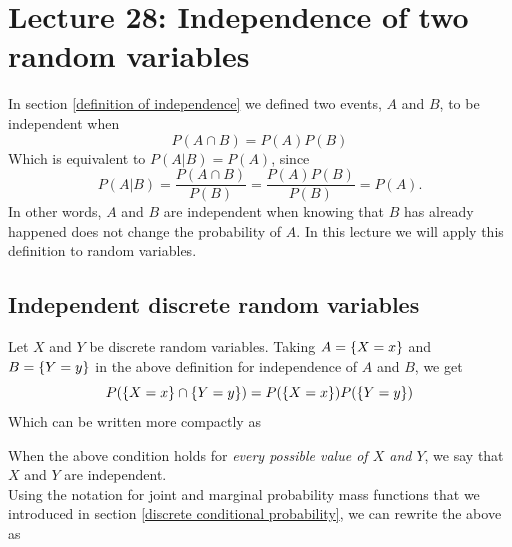 \chapter{Lecture 28: Independence of two random variables}
In section \ref{definition of independence} we defined two events, $A$ and $B$, to be independent when
\[
P(A \cap B) = P(A)P(B)
\]
Which is equivalent to $P(A|B) = P(A)$, since
\[
P(A|B) = \frac{P(A \cap B)}{P(B)} = \frac{P(A)P(B)}{P(B)} = P(A).
\]
In other words, $A$ and $B$ are independent when knowing that $B$ has already happened does not change the probability of $A$. In this lecture we will apply this definition to random variables.

\section{Independent discrete random variables}
Let $X$ and $Y$ be discrete random variables. Taking $A = \left\{X = x\right\}$ and $B = \left\{Y = y\right\}$ in the above definition for independence of $A$ and $B$, we get
\[
P(\left\{X=x\right\} \cap \left\{Y = y\right\}) = P(\left\{X = x\right\})P(\left\{Y = y\right\})
\]
Which can be written more compactly as

  	\bigskip
	
	\hfil{}
	\bigskip
	\bigskip

\noindent When the above condition holds for \textit{every possible value of $X$ and $Y$}, we say that $X$ and $Y$ are independent. \\

\noindent Using the notation for joint and marginal probability mass functions that we introduced in section \ref{discrete conditional probability}, we can rewrite the above as

  	\bigskip
	
	\hfil{}
	\bigskip
	\bigskip


